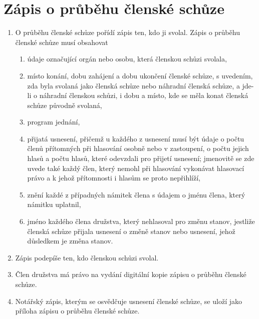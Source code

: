 \section{Zápis o průběhu členské schůze}
\begin{enumerate}
    \item O průběhu členské schůze pořídí zápis ten, kdo ji svolal. Zápis o průběhu členské schůze musí obsahovat
    \begin{enumerate}[label=\alph*.]
        \item údaje označující orgán nebo osobu, která členskou schůzi svolala,
        \item místo konání, dobu zahájení a dobu ukončení členské schůze, s uvedením, zda byla svolaná jako členská schůze nebo náhradní členská schůze, a jde-li o náhradní členskou schůzi, i dobu a místo, kde se měla konat členská schůze původně svolaná,
        \item program jednání,
        \item přijatá usnesení, přičemž u každého z usnesení musí být údaje o počtu členů přítomných při hlasování osobně nebo v zastoupení, o počtu jejich hlasů a počtu hlasů, které odevzdali pro přijetí usnesení; jmenovitě se zde uvede také každý člen, který nemohl při hlasování vykonávat hlasovací právo a k jehož přítomnosti i hlasům se proto nepřihlíží,
        \item znění každé z případných námitek člena s údajem o jménu člena, který námitku uplatnil,
        \item jméno každého člena družstva, který nehlasoval pro změnu stanov, jestliže členská schůze přijala usnesení o změně stanov nebo usnesení, jehož důsledkem je změna stanov.
    \end{enumerate}
    \item Zápis podepíše ten, kdo členskou schůzi svolal.
    \item Člen družstva má právo na vydání digitální kopie zápisu o průběhu členské schůze. 
    \item Notářský zápis, kterým se osvědčuje usnesení členské schůze, se uloží jako příloha zápisu o průběhu členské schůze.
\end{enumerate}

